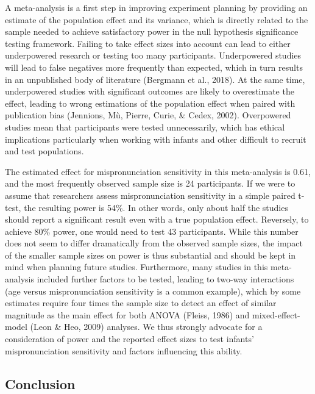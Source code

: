 \documentclass[man]{apa6}
\begin{document}
A meta-analysis is a first step in improving experiment planning by providing an estimate of the population effect and its variance, which is directly related to the sample needed to achieve satisfactory power in the null hypothesis significance testing framework. Failing to take effect sizes into account can lead to either underpowered research or testing too many participants. Underpowered studies will lead to false negatives more frequently than expected, which in turn results in an unpublished body of literature (Bergmann et al., 2018). At the same time, underpowered studies with significant outcomes are likely to overestimate the effect, leading to wrong estimations of the population effect when paired with publication bias (Jennions, Mù, Pierre, Curie, \& Cedex, 2002). Overpowered studies mean that participants were tested unnecessarily, which has ethical implications particularly when working with infants and other difficult to recruit and test populations.

The estimated effect for mispronunciation sensitivity in this meta-analysis is 0.61, and the most frequently observed sample size is 24 participants. If we were to assume that researchers assess mispronunciation sensitivity in a simple paired t-test, the resulting power is 54\%. In other words, only about half the studies should report a significant result even with a true population effect. Reversely, to achieve 80\% power, one would need to test 43 participants. While this number does not seem to differ dramatically from the observed sample sizes, the impact of the smaller sample sizes on power is thus substantial and should be kept in mind when planning future studies. Furthermore, many studies in this meta-analysis included further factors to be tested, leading to two-way interactions (age versus mispronunciation sensitivity is a common example), which by some estimates require four times the sample size to detect an effect of similar magnitude as the main effect for both ANOVA (Fleiss, 1986) and mixed-effect-model (Leon \& Heo, 2009) analyses. We thus strongly advocate for a consideration of power and the reported effect sizes to test infants' mispronunciation sensitivity and factors influencing this ability.

\hypertarget{conclusion}{%
\subsection{Conclusion}\label{conclusion}}
\end{document}

